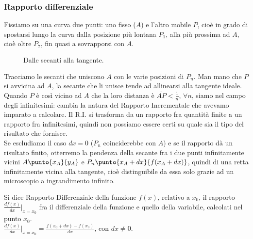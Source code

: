 \subsubsection{Rapporto differenziale}
\label{subsubsec:diff01_rappdiff}

\begin{esempio}
Fissiamo su una curva due punti: uno fisso ($A$) e l'altro mobile $P$, cioè 
in 
grado di spostarsi lungo la curva dalla posizione più lontana $P_1$, alla 
più 
prossima ad $A$, cioè oltre $P_7$, fin quasi a sovrapporsi con $A$.

\begin{figure}[h]
\begin{inaccessibleblock}
 \begin{center}
\secanticurva
 \end{center}
\end{inaccessibleblock}
\caption{Dalle secanti alla tangente.} \label{fig:diff01_sectang}
\end{figure}
\end{esempio}

Tracciamo le secanti che uniscono $A$ con le varie posizioni di $P_n$. 
Man mano che $P$ si avvicina ad $A$, la secante che li unisce tende 
ad allinearsi alla tangente ideale.\\
Quando $P$ è così vicino ad $A$ che la loro distanza è 
$\overline{AP}<\frac{1}{n}$,
$\forall n$, siamo nel campo degli infinitesimi: cambia la natura del 
Rapporto Incrementale che avevamo imparato a calcolare. Il R.I. si 
trasforma da un rapporto fra quantità finite a un rapporto fra infinitesimi,
quindi non possiamo essere certi su quale sia il tipo del risultato che 
fornisce.\\
Se escludiamo il caso $dx=0$ ($P_n$ coinciderebbe con $A$) e se il rapporto
dà un risultato finito, otterremo la pendenza della secante fra i due 
punti infinitamente vicini $A\punto{x_A}{y_A}$ e $P_n\punto{x_A+dx}{f(x_A+dx)}$,
quindi di una retta infinitamente vicina alla tangente, cioè distinguibile da 
essa solo grazie ad un microscopio a ingrandimento infinito.

\begin{definizione}
 Si dice Rapporto Differenziale della funzione $f(x)$, relativo a $x_0$,
 il rapporto $\frac{df(x)}{dx}\big|_{x=x_0}$ fra il differenziale della 
funzione  e quello della variabile, calcolati nel punto $x_0$. \\
 $\frac{df(x)}{dx}\big|_{x=x_0}=\frac{f(x_0+dx)-f(x_0)}{dx}$, con $dx\ne 0$.
\end{definizione}

